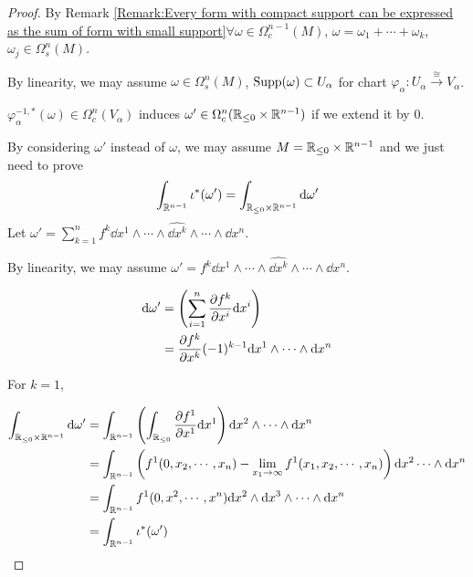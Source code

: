 \begin{proof}
    By Remark \ref{Remark:Every form with compact support can be expressed as the sum of form with small support}$ \forall \omega\in \Omega_c^{n-1}(M) $,  $ \omega=\omega_1+\cdots+\omega_k $,  $ \omega_j\in\Omega_s^n(M) $.
    
    By linearity, we may assume  $ \omega\in \Omega_s^n(M) $,  $ \mathrm{Supp}(\omega)\subset U_\alpha $ for chart  $ \varphi_\alpha:U_\alpha\xrightarrow{\cong}V_\alpha $.
    
     $ \varphi_\alpha^{-1,*}(\omega)\in\Omega_c^n(V_\alpha) $ induces  $ \omega'\in \Omega_c^n(\mathbb R_{\leq 0}\times \mathbb R^{n-1}) $ if we extend it by 0.
     
     By considering  $ \omega' $ instead of  $ \omega $, we may assume  $ M=\mathbb R_{\leq 0}\times\mathbb R^{n-1} $ and we just need to prove 
     \[\int_{\mathbb R^{n-1}}\iota^*(\omega')=\int_{\mathbb R_{\leq 0}\times \mathbb R^{n-1}}\mathrm{d} \omega'\]
     Let  $ \omega'=\sum_{k=1}^nf^k\dd x^1\wedge\cdots\wedge \hat{\dd x^k}\wedge\cdots\wedge\dd x^n $.
     
     By linearity, we may assume  $ \omega'=f^k\dd x^1\wedge\cdots\wedge\hat{\dd x^k}\wedge\cdots\wedge\dd x^n $.
     
    \begin{equation}
        \begin{aligned}
            \mathrm{d} \omega'&=\left(\displaystyle\sum_{i=1}^n\frac{\partial f^k}{\partial x^i}\mathrm{d} x^i\right)\\
            &=\frac{\partial f^k}{\partial x^k}(-1)^{k-1}\mathrm{d} x^1\wedge\cdots\wedge\mathrm{d} x^n
        \end{aligned}
    \end{equation}
    
    For  $ k=1 $,  
    
    \begin{equation*}
        \begin{aligned}
            \int_{\mathbb R_{ \leq 0}\times \mathbb R^{n-1}}\mathrm{d} \omega'&=\int_{\mathbb R^{n-1}}\left(\int_{\mathbb R_{\leq 0}}\frac{\partial f^1}{\partial x^1}\mathrm{d} x^1\right)\mathrm{d} x^2\wedge\cdots\wedge\mathrm{d} x^n\\
            &=\int_{\mathbb R^{n-1}}\left(f^1(0,x_2,\cdots,x_n)-\displaystyle\lim_{x_1\to\infty}f^1(x_1,x_2,\cdots,x_n)\right)\mathrm{d} x^2\cdots\wedge \mathrm{d} x^n\\
            &=\int_{\mathbb R^{n-1}}f^1(0,x^2,\cdots,x^n)\mathrm{d} x^2\wedge\mathrm{d} x^3\wedge\cdots\wedge\mathrm{d} x^n\\
            &=\int_{\mathbb R^{n-1}}\iota^*(\omega')
        \end{aligned}
    \end{equation*}


\end{proof}
